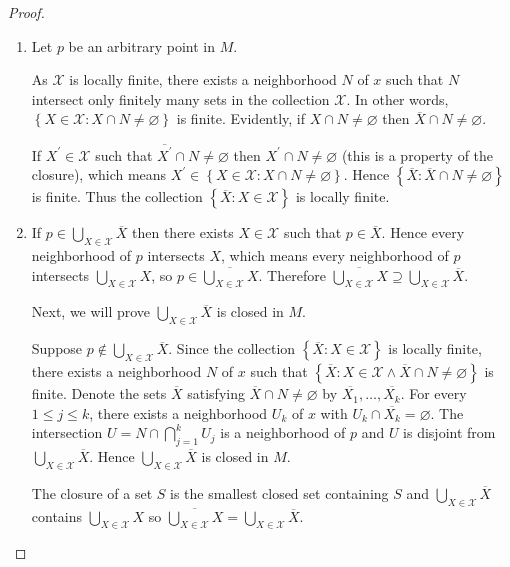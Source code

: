 \begin{proof}
    \begin{enumerate}[itemsep=0pt,label={(\alph*)}]
        \item Let \( p \) be an arbitrary point in \( M \).

              As \( \mathcal{X} \) is locally finite, there exists a neighborhood \( N \) of \( x \) such that \( N \) intersect only finitely many sets in the collection \( \mathcal{X} \). In other words, \( \left\{ X \in \mathcal{X} : X \cap N \ne \varnothing \right\} \) is finite. Evidently, if \( X \cap N \ne \varnothing \) then \( \overline{X} \cap N \ne \varnothing \).

              If \( X^{\prime} \in \mathcal{X} \) such that \( \overline{X^{\prime}} \cap N \ne \varnothing \) then \( X^{\prime} \cap N \ne \varnothing \) (this is a property of the closure), which means \( X^{\prime} \in \left\{ X \in \mathcal{X} : X \cap N \ne \varnothing \right\} \). Hence \( \left\{ \overline{X}: \overline{X} \cap N \ne \varnothing \right\} \) is finite. Thus the collection \( \left\{ \overline{X} : X \in \mathcal{X} \right\} \) is locally finite.
        \item If \( p \in \bigcup_{X \in \mathcal{X}} \overline{X} \) then there exists \( X \in \mathcal{X} \) such that \( p \in \overline{X} \). Hence every neighborhood of \( p \) intersects \( X \), which means every neighborhood of \( p \) intersects \( \bigcup_{X \in \mathcal{X}} X \), so \( p \in \overline{\bigcup_{X \in \mathcal{X}} X} \). Therefore \( \overline{\bigcup_{X \in \mathcal{X}} X} \supseteq \bigcup_{X \in \mathcal{X}} \overline{X} \).

              Next, we will prove \( \bigcup_{X \in \mathcal{X}} \overline{X} \) is closed in \( M \).

              Suppose \( p \notin \bigcup_{X \in \mathcal{X}} \overline{X} \). Since the collection \( \left\{ \overline{X} : X \in \mathcal{X} \right\} \) is locally finite, there exists a neighborhood \( N \) of \( x \) such that \( \left\{ \overline{X} : X \in \mathcal{X} \land \overline{X} \cap N \ne \varnothing \right\} \) is finite. Denote the sets \( \overline{X} \) satisfying \( \overline{X} \cap N \ne \varnothing \) by \( \overline{X_{1}}, \ldots, \overline{X_{k}} \). For every \( 1 \le j \le k \), there exists a neighborhood \( U_{k} \) of \( x \) with \( U_{k} \cap \overline{X_{k}} = \varnothing \). The intersection \( U = N \cap \bigcap_{j=1}^{k} U_{j} \) is a neighborhood of \( p \) and \( U \) is disjoint from \( \bigcup_{X \in \mathcal{X}} \overline{X} \). Hence \( \bigcup_{X \in \mathcal{X}} \overline{X} \) is closed in \( M \).

              The closure of a set \( S \) is the smallest closed set containing \( S \) and \( \bigcup_{X \in \mathcal{X}} \overline{X} \) contains \( \bigcup_{X \in \mathcal{X}} X \) so \( \overline{\bigcup_{X \in \mathcal{X}} X} = \bigcup_{X \in \mathcal{X}} \overline{X} \).
    \end{enumerate}
\end{proof}

